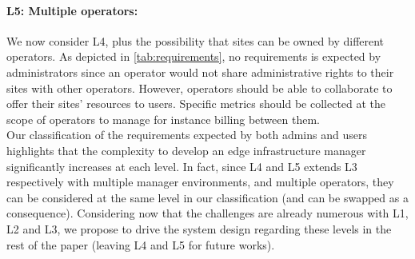 \paragraph{L5: Multiple operators:}
We now consider L4, plus the possibility that sites can be owned by different
operators. As depicted in \cref{tab:requirements}, no requirements is expected
by administrators since an operator would not share administrative rights to
their sites with other operators. However,
operators should be able to collaborate to offer their sites' resources to
users. Specific metrics should be collected at the scope of operators to
manage for instance billing between them.\\

Our classification of the requirements expected by both admins and users
highlights that the complexity to develop an edge infrastructure manager
significantly increases at each level. In fact, since L4 and L5 extends L3
respectively with multiple manager environments, and multiple operators, they
can be considered at the same level in our classification (and can be swapped
as a consequence).
Considering now that the challenges are already numerous with L1, L2 and L3, we
propose to drive the system design regarding these levels in the rest of the
paper (leaving L4 and L5 for future works).

